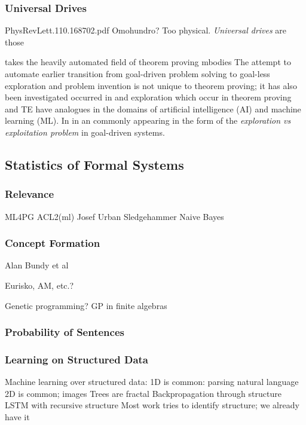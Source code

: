 \documentclass[]{article}
\begin{document}
\iffalse

\subsubsection{Universal Drives}

PhysRevLett.110.168702.pdf
Omohundro? Too physical.
\emph{Universal drives} are those

 takes the heavily automated field of theorem proving   mbodies The attempt to automate earlier transition from goal-driven problem solving to goal-less exploration and problem invention is not unique to theorem proving; it has also been investigated occurred in  and exploration which occur in theorem proving and TE have analogues in the domains of artificial intelligence (AI) and machine learning (ML). In  in an commonly appearing in the form of the \emph{exploration vs exploitation problem} in goal-driven systems.

\subsection{Statistics of Formal Systems}



\subsubsection{Relevance}

ML4PG
ACL2(ml)
Josef Urban
Sledgehammer
Naive Bayes

\subsubsection{Concept Formation}

Alan Bundy et al

Eurisko, AM, etc.?

Genetic programming? GP in finite algebras

\subsubsection{Probability of Sentences}

\subsubsection{Learning on Structured Data}

Machine learning over structured data:
1D is common: parsing natural language
2D is common; images
Trees are fractal
Backpropagation through structure
LSTM with recursive structure
Most work tries to identify structure; we already have it
\end{document}
